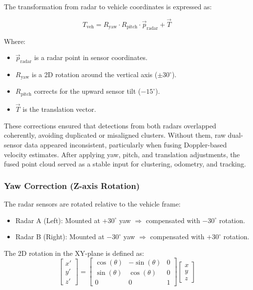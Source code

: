 The transformation from radar to vehicle coordinates is expressed as:

\begin{equation}
T_{\text{veh}} = R_{\text{yaw}} \cdot R_{\text{pitch}} \cdot \vec{p}_{\text{radar}} + \vec{T}
\label{eq:radar_to_vehicle_transform}
\end{equation}

Where:
\begin{itemize}
    \item \( \vec{p}_{\text{radar}} \) is a radar point in sensor coordinates.
    \item \( R_{\text{yaw}} \) is a 2D rotation around the vertical axis ($\pm30^\circ$).
    \item \( R_{\text{pitch}} \) corrects for the upward sensor tilt ($-15^\circ$).
    \item \( \vec{T} \) is the translation vector.
\end{itemize}

These corrections ensured that detections from both radars overlapped coherently, avoiding duplicated or misaligned clusters.  
Without them, raw dual-sensor data appeared inconsistent, particularly when fusing Doppler-based velocity estimates.  
After applying yaw, pitch, and translation adjustments, the fused point cloud served as a stable input for clustering, odometry, and tracking.

\vspace{0.5em}
\subsubsection{Yaw Correction (Z-axis Rotation)}
The radar sensors are rotated relative to the vehicle frame:

\begin{itemize}
    \item Radar A (Left): Mounted at $+30^\circ$ yaw $\Rightarrow$ compensated with $-30^\circ$ rotation.
    \item Radar B (Right): Mounted at $-30^\circ$ yaw $\Rightarrow$ compensated with $+30^\circ$ rotation.
\end{itemize}

The 2D rotation in the XY-plane is defined as:
\[
\begin{bmatrix}
x' \\
y' \\
z'
\end{bmatrix}
=
\begin{bmatrix}
\cos(\theta) & -\sin(\theta) & 0 \\
\sin(\theta) & \cos(\theta) & 0 \\
0 & 0 & 1
\end{bmatrix}
\begin{bmatrix}
x \\
y \\
z
\end{bmatrix}
\]

